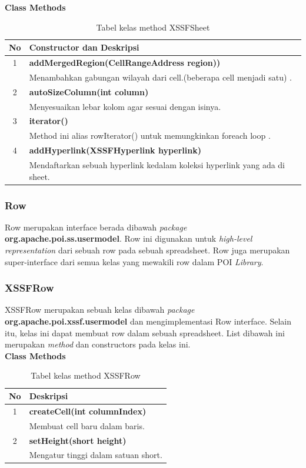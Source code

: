 \noindent \textbf{Class Methods}
\begin{table}[H]
		\centering
		\caption{Tabel kelas method XSSFSheet}
		\label{tab:methodXSSFSheet}
	\begin{tabular}{|c|p{12cm}|}
		\hline
		\textbf{No} & \textbf{Constructor dan Deskripsi} \\ \hline \hline
		1 & \textbf{addMergedRegion(CellRangeAddress region))}\\
			&	Menambahkan gabungan wilayah dari cell.(beberapa cell menjadi satu)   .\\ \hline 
		2 & \textbf{autoSizeColumn(int column)}\\
			& Menyesuaikan lebar kolom agar sesuai dengan isinya.\\ \hline
		3 & \textbf{iterator()}\\
			&	Method ini alias rowIterator() untuk memungkinkan foreach loop .\\ \hline
		4 & \textbf{addHyperlink(XSSFHyperlink hyperlink)}\\
			&	Mendaftarkan sebuah hyperlink kedalam koleksi hyperlink yang ada di sheet.\\ \hline	
	\end{tabular}
\end{table}

\subsubsection{Row}
\label{subs:Row}
Row merupakan interface berada dibawah \textit{package} \textbf{org.apache.poi.ss.usermodel}. Row ini digunakan untuk \textit{high-level representation} dari sebuah row pada sebuah spreadsheet. Row juga merupakan super-interface dari semua kelas yang mewakili row dalam POI \textit{Library}.\cite{apachepoi2}

\subsubsection{XSSFRow}
\label{subs:XSSFRow}
XSSFRow merupakan sebuah kelas dibawah \textit{package} \textbf{org.apache.poi.xssf.usermodel} dan mengimplementasi Row interface. Selain itu, kelas ini dapat membuat row dalam sebuah spreadsheet. List dibawah ini merupakan \textit{method} dan constructors pada kelas ini.\cite{apachepoi2}
 \\ 
\noindent \textbf{Class Methods}
\begin{table}[H]
		\centering
		\caption{Tabel kelas method XSSFRow}
		\label{tab:methodXSSFRow}
	\begin{tabular}{|c|p{12cm}|}
		\hline
		\textbf{No} & \textbf{Deskripsi} \\ \hline \hline
		1 & \textbf{createCell(int columnIndex)}\\
			&	Membuat cell baru dalam baris.\\ \hline 
		2 & \textbf{setHeight(short height)}\\
			&	Mengatur tinggi dalam satuan short.\\ \hline
	\end{tabular}
\end{table}

